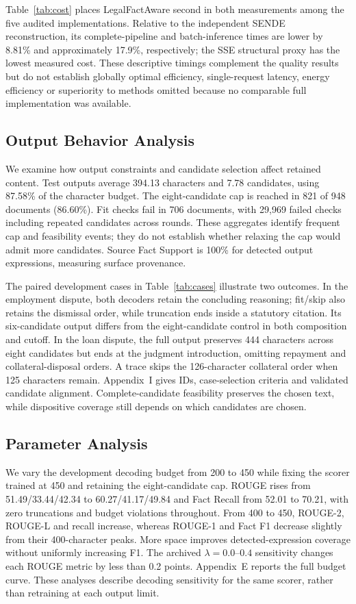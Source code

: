 \documentclass[10pt,twocolumn,letterpaper]{article}
\begin{document}
Table~\ref{tab:cost} places LegalFactAware second in both measurements among the five audited implementations. Relative to the independent SENDE reconstruction, its complete-pipeline and batch-inference times are lower by 8.81\% and approximately 17.9\%, respectively; the SSE structural proxy has the lowest measured cost. These descriptive timings complement the quality results but do not establish globally optimal efficiency, single-request latency, energy efficiency or superiority to methods omitted because no comparable full implementation was available.

\subsection{Output Behavior Analysis}\label{output-behavior-analysis}
We examine how output constraints and candidate selection affect retained content. Test outputs average 394.13 characters and 7.78 candidates, using 87.58\% of the character budget. The eight-candidate cap is reached in 821 of 948 documents (86.60\%). Fit checks fail in 706 documents, with 29,969 failed checks including repeated candidates across rounds. These aggregates identify frequent cap and feasibility events; they do not establish whether relaxing the cap would admit more candidates. Source Fact Support is 100\% for detected output expressions, measuring surface provenance.


The paired development cases in Table~\ref{tab:cases} illustrate two outcomes. In the employment dispute, both decoders retain the concluding reasoning; fit/skip also retains the dismissal order, while truncation ends inside a statutory citation. Its six-candidate output differs from the eight-candidate control in both composition and cutoff. In the loan dispute, the full output preserves 444 characters across eight candidates but ends at the judgment introduction, omitting repayment and collateral-disposal orders. A trace skips the 126-character collateral order when 125 characters remain. Appendix~I gives IDs, case-selection criteria and validated candidate alignment. Complete-candidate feasibility preserves the chosen text, while dispositive coverage still depends on which candidates are chosen.

\subsection{Parameter Analysis}\label{budget-sensitivity-coverage-and-complete-sentence-feasibility}
We vary the development decoding budget from 200 to 450 while fixing the scorer trained at 450 and retaining the eight-candidate cap. ROUGE rises from 51.49/33.44/42.34 to 60.27/41.17/49.84 and Fact Recall from 52.01 to 70.21, with zero truncations and budget violations throughout. From 400 to 450, ROUGE-2, ROUGE-L and recall increase, whereas ROUGE-1 and Fact F1 decrease slightly from their 400-character peaks. More space improves detected-expression coverage without uniformly increasing F1. The archived $\lambda=0.0$--$0.4$ sensitivity changes each ROUGE metric by less than 0.2 points. Appendix~E reports the full budget curve. These analyses describe decoding sensitivity for the same scorer, rather than retraining at each output limit.
\end{document}
